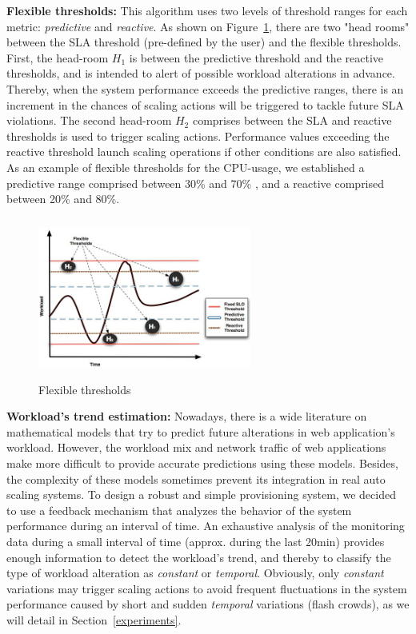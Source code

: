 \textbf{Flexible thresholds:} This algorithm uses two levels of threshold ranges for each metric: \emph{predictive} and \emph{reactive}. As shown on Figure~\ref{flexibleThr}, there are two "head rooms" between the SLA threshold (pre-defined by the user) and the flexible thresholds.  First, the head-room $H_1$ is between the predictive threshold and the reactive thresholds, and is intended to alert of possible workload alterations in advance.  Thereby, when the system performance exceeds the predictive ranges, there is an increment in the chances of scaling actions will be triggered to tackle future SLA violations. The second head-room $H_2$ comprises between the SLA and reactive thresholds is used to trigger scaling actions. Performance values exceeding the reactive threshold launch scaling operations if other conditions are also satisfied. As an example of flexible thresholds for the CPU-usage, we established a predictive range comprised between 30\% and 70\% , and a reactive comprised between 20\% and 80\%.  

\begin{figure}
\begin{center}
\includegraphics[width=7cm, height=5.3cm]{./images/thresholdGraphic.jpg}
\end{center}
\label{flexibleThr}
\caption{Flexible thresholds}
\end{figure}

\textbf{Workload's trend estimation:} Nowadays, there is a wide literature on mathematical models that try to predict future alterations in web application's workload. However, the workload mix and network traffic of web applications make more difficult to provide accurate predictions using these models. Besides, the complexity of these models sometimes prevent its integration in real auto scaling systems. To design a robust and simple provisioning system, we decided to use a feedback mechanism that analyzes the behavior of the system performance during an interval of time. An exhaustive analysis of the monitoring data during a small interval of time (approx. during the last 20min) provides enough information to detect the workload's trend, and thereby to classify the type of workload alteration as \emph{constant} or \emph{temporal}. Obviously, only \emph{constant} variations may trigger scaling actions to avoid frequent fluctuations in the system performance caused by short and sudden \emph{temporal} variations (flash crowds), as we will detail in Section~\ref{experiments}.

